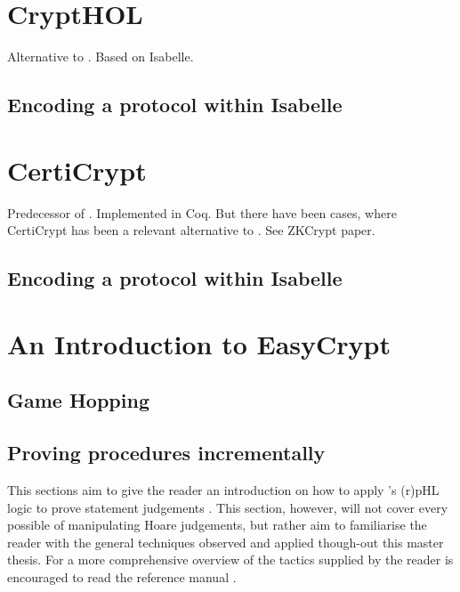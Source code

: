 \chapter{CryptHOL}
\label{ch:crypthol}
Alternative to \easycrypt. Based on Isabelle.


\section{Encoding a protocol within Isabelle}
\label{sec:protocol_in_isabelle}


\chapter{CertiCrypt}
\label{ch:certicrypt}
Predecessor of \easycrypt. Implemented in Coq. But there have been cases, where CertiCrypt has been
a relevant alternative to \easycrypt. See ZKCrypt paper.

\section{Encoding a protocol within Isabelle}
\label{sec:protocol_in_certicrypt}

\chapter{An Introduction to EasyCrypt}
\label{sec:ec_introcution}

\section{Game Hopping}
\label{sec:game_hopping_ec}

\section{Proving procedures incrementally}
This sections aim to give the reader an introduction on how to
apply \easycrypt's (r)pHL logic to prove statement judgements .
This section, however, will not cover every possible of manipulating Hoare
judgements, but rather aim to familiarise the reader with the general techniques
observed and applied though-out this master thesis. For a more comprehensive
overview of the tactics supplied by \easycrypt the reader is encouraged to read
the reference manual \cite{ec-ref-man}.

